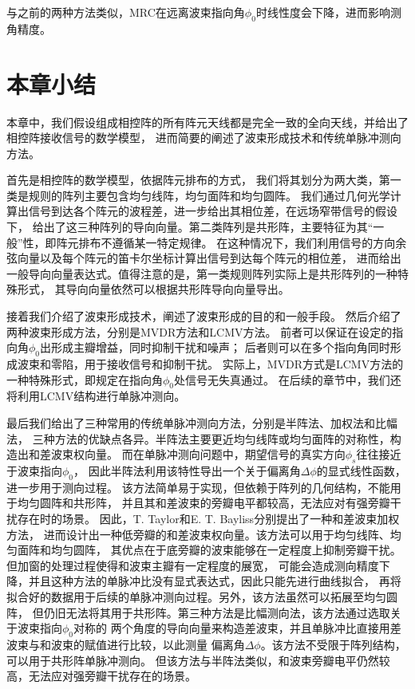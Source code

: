 \documentclass[master]{thesis-uestc}
\begin{document}
与之前的两种方法类似，MRC在远离波束指向角$\phi_0$时线性度会下降，进而影响测角精度。

\section{本章小结}
本章中，我们假设组成相控阵的所有阵元天线都是完全一致的全向天线，并给出了相控阵接收信号的数学模型，
进而简要的阐述了波束形成技术和传统单脉冲测向方法。

首先是相控阵的数学模型，依据阵元排布的方式，
我们将其划分为两大类，第一类是规则的阵列主要包含均匀线阵，均匀面阵和均匀圆阵。
我们通过几何光学计算出信号到达各个阵元的波程差，进一步给出其相位差，在远场窄带信号的假设下，
给出了这三种阵列的导向向量。第二类阵列是共形阵，主要特征为其“一般”性，即阵元排布不遵循某一特定规律。
在这种情况下，我们利用信号的方向余弦向量以及每个阵元的笛卡尔坐标计算出信号到达每个阵元的相位差，
进而给出一般导向向量表达式。值得注意的是，第一类规则阵列实际上是共形阵列的一种特殊形式，
其导向向量依然可以根据共形阵导向向量导出。

接着我们介绍了波束形成技术，阐述了波束形成的目的和一般手段。
然后介绍了两种波束形成方法，分别是MVDR方法和LCMV方法。
前者可以保证在设定的指向角$\phi_0$出形成主瓣增益，同时抑制干扰和噪声；
后者则可以在多个指向角同时形成波束和零陷，用于接收信号和抑制干扰。
实际上，MVDR方式是LCMV方法的一种特殊形式，即规定在指向角$\phi_0$处信号无失真通过。
在后续的章节中，我们还将利用LCMV结构进行单脉冲测向。

最后我们给出了三种常用的传统单脉冲测向方法，分别是半阵法、加权法和比幅法，
三种方法的优缺点各异。半阵法主要更近均匀线阵或均匀面阵的对称性，构造出和差波束权向量。
而在单脉冲测向问题中，期望信号的真实方向$\phi_s$往往接近于波束指向$\phi_0$，
因此半阵法利用该特性导出一个关于偏离角$\Delta\phi$的显式线性函数，进一步用于测向过程。
该方法简单易于实现，但依赖于阵列的几何结构，不能用于均匀圆阵和共形阵，
并且其和差波束的旁瓣电平都较高，无法应对有强旁瓣干扰存在时的场景。
因此，T. Taylor和E. T. Bayliss分别提出了一种和差波束加权方法，
进而设计出一种低旁瓣的和差波束权向量。该方法可以用于均匀线阵、均匀面阵和均匀圆阵，
其优点在于底旁瓣的波束能够在一定程度上抑制旁瓣干扰。但加窗的处理过程使得和波束主瓣有一定程度的展宽，
可能会造成测向精度下降，并且这种方法的单脉冲比没有显式表达式，因此只能先进行曲线拟合，
再将拟合好的数据用于后续的单脉冲测向过程。另外，该方法虽然可以拓展至均匀圆阵，
但仍旧无法将其用于共形阵。第三种方法是比幅测向法，该方法通过选取关于波束指向$\phi_0$对称的
两个角度的导向向量来构造差波束，并且单脉冲比直接用差波束与和波束的赋值进行比较，以此测量
偏离角$\Delta\phi$。该方法不受限于阵列结构，可以用于共形阵单脉冲测向。
但该方法与半阵法类似，和波束旁瓣电平仍然较高，无法应对强旁瓣干扰存在的场景。
\end{document}
